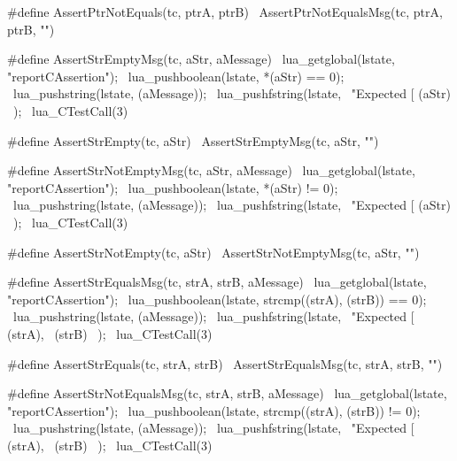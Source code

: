 #define AssertPtrNotEquals(tc, ptrA, ptrB) \
  AssertPtrNotEqualsMsg(tc, ptrA, ptrB, "")
\stopCHeader

\stopTestSuite

\startTestSuite[assertStrEmpty]

\startCHeader
#define AssertStrEmptyMsg(tc, aStr, aMessage) \
  lua_getglobal(lstate, "reportCAssertion");  \
  lua_pushboolean(lstate, *(aStr) == 0);      \
  lua_pushstring(lstate, (aMessage));         \
  lua_pushfstring(lstate,                     \
      "Expected [%
      (aStr)                                  \
    );                                        \
  lua_CTestCall(3)

#define AssertStrEmpty(tc, aStr) \
  AssertStrEmptyMsg(tc, aStr, "")
\stopCHeader

\stopTestSuite

\startTestSuite[assertStrNotEmpty]

\startCHeader
#define AssertStrNotEmptyMsg(tc, aStr, aMessage) \
  lua_getglobal(lstate, "reportCAssertion");     \
  lua_pushboolean(lstate, *(aStr) != 0);         \
  lua_pushstring(lstate, (aMessage));            \
  lua_pushfstring(lstate,                        \
      "Expected [%
      (aStr)                                     \
    );                                           \
  lua_CTestCall(3)

#define AssertStrNotEmpty(tc, aStr) \
  AssertStrNotEmptyMsg(tc, aStr, "")
\stopCHeader

\stopTestSuite

\startTestSuite[assertStrEquals]

\startCHeader
#define AssertStrEqualsMsg(tc, strA, strB, aMessage)    \
  lua_getglobal(lstate, "reportCAssertion");            \
  lua_pushboolean(lstate, strcmp((strA), (strB)) == 0); \
  lua_pushstring(lstate, (aMessage));                   \
  lua_pushfstring(lstate,                               \
      "Expected [%
      (strA),                                           \
      (strB)                                            \
    );                                                  \
  lua_CTestCall(3)

#define AssertStrEquals(tc, strA, strB) \
  AssertStrEqualsMsg(tc, strA, strB, "")
\stopCHeader

\stopTestSuite

\startTestSuite[assertStrNotEquals]

\startCHeader
#define AssertStrNotEqualsMsg(tc, strA, strB, aMessage) \
  lua_getglobal(lstate, "reportCAssertion");            \
  lua_pushboolean(lstate, strcmp((strA), (strB)) != 0); \
  lua_pushstring(lstate, (aMessage));                   \
  lua_pushfstring(lstate,                               \
      "Expected [%
      (strA),                                           \
      (strB)                                            \
    );                                                  \
  lua_CTestCall(3)


